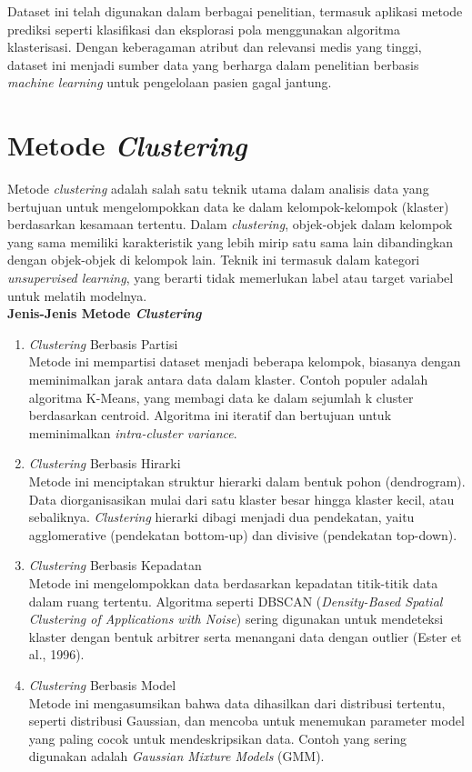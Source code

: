 \documentclass[english,12pt,a4paper,openany]{book}
\begin{document}
	Dataset ini telah digunakan dalam berbagai penelitian, termasuk aplikasi metode prediksi seperti klasifikasi dan eksplorasi pola menggunakan algoritma klasterisasi. Dengan keberagaman atribut dan relevansi medis yang tinggi, dataset ini menjadi sumber data yang berharga dalam penelitian berbasis \textit{machine learning} untuk pengelolaan pasien gagal jantung.
	
	\section{Metode \textit{Clustering}}
	Metode \textit{clustering} adalah salah satu teknik utama dalam analisis data yang bertujuan untuk mengelompokkan data ke dalam kelompok-kelompok (klaster) berdasarkan kesamaan tertentu. Dalam \textit{clustering}, objek-objek dalam kelompok yang sama memiliki karakteristik yang lebih mirip satu sama lain dibandingkan dengan objek-objek di kelompok lain. Teknik ini termasuk dalam kategori \textit{unsupervised learning}, yang berarti tidak memerlukan label atau target variabel untuk melatih modelnya.\\
	
	\textbf{Jenis-Jenis Metode \textit{Clustering}}
	\begin{enumerate}
		\item \textit{Clustering} Berbasis Partisi\\
		Metode ini mempartisi dataset menjadi beberapa kelompok, biasanya dengan meminimalkan jarak antara data dalam klaster. Contoh populer adalah algoritma K-Means, yang membagi data ke dalam sejumlah k cluster berdasarkan centroid. Algoritma ini iteratif dan bertujuan untuk meminimalkan \textit{intra-cluster variance}.
		\item \textit{Clustering} Berbasis Hirarki\\
		Metode ini menciptakan struktur hierarki dalam bentuk pohon (dendrogram). Data diorganisasikan mulai dari satu klaster besar hingga klaster kecil, atau sebaliknya. \textit{Clustering} hierarki dibagi menjadi dua pendekatan, yaitu agglomerative (pendekatan bottom-up) dan divisive (pendekatan top-down).
		\item \textit{Clustering} Berbasis Kepadatan\\
		Metode ini mengelompokkan data berdasarkan kepadatan titik-titik data dalam ruang tertentu. Algoritma seperti DBSCAN (\textit{Density-Based Spatial Clustering of Applications with Noise}) sering digunakan untuk mendeteksi klaster dengan bentuk arbitrer serta menangani data dengan outlier (Ester et al., 1996).
		\item \textit{Clustering }Berbasis Model\\
		Metode ini mengasumsikan bahwa data dihasilkan dari distribusi tertentu, seperti distribusi Gaussian, dan mencoba untuk menemukan parameter model yang paling cocok untuk mendeskripsikan data. Contoh yang sering digunakan adalah \textit{Gaussian Mixture Models} (GMM).
	\end{enumerate}
	
\end{document}
